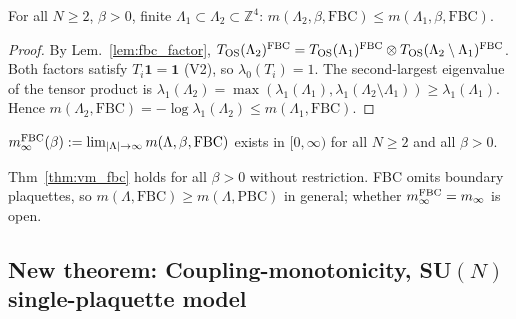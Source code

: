 \begin{theorem}
\label{thm:vm_fbc}
For all $N\ge 2$, $\beta>0$, finite $\Lambda_1\subset\Lambda_2\subset\mathbb{Z}^4$:
$m(\Lambda_2,\beta,\mathrm{FBC})\le m(\Lambda_1,\beta,\mathrm{FBC})$.
\end{theorem}
\begin{proof}
By Lem.~\ref{lem:fbc_factor}, $T_{\rm OS}(\Lambda_2)^{\rm FBC}=T_{\rm OS}(\Lambda_1)^{\rm FBC}\otimes T_{\rm OS}(\Lambda_2\setminus\Lambda_1)^{\rm FBC}$.
Both factors satisfy $T_i\mathbf{1}=\mathbf{1}$ (V2), so $\lambda_0(T_i)=1$.
The second-largest eigenvalue of the tensor product is
$\lambda_1(\Lambda_2)=\max(\lambda_1(\Lambda_1),\lambda_1(\Lambda_2\setminus\Lambda_1))\ge\lambda_1(\Lambda_1)$.
Hence $m(\Lambda_2,\mathrm{FBC})=-\log\lambda_1(\Lambda_2)\le m(\Lambda_1,\mathrm{FBC})$.
\end{proof}

\begin{corollary}
$m_{\infty}^{\rm FBC}(\beta):=\lim_{|\Lambda|\to\infty}m(\Lambda,\beta,\mathrm{FBC})$
exists in $[0,\infty)$ for all $N\ge 2$ and all $\beta>0$.
\end{corollary}

\begin{remark}
Thm~\ref{thm:vm_fbc} holds for all $\beta>0$ without restriction.
FBC omits boundary plaquettes, so $m(\Lambda,\mathrm{FBC})\ge m(\Lambda,\mathrm{PBC})$ in general;
whether $m_{\infty}^{\rm FBC}=m_{\infty}$ is open.
\end{remark}

\subsection{New theorem: Coupling-monotonicity, SU$(N)$ single-plaquette model}
\label{ssec:cm_turan}

